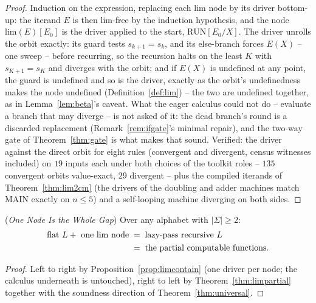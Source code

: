 \begin{proof}
    Induction on the expression, replacing each $\mathrm{lim}$ node by
    its driver bottom-up: the iterand $E$ is then $\mathrm{lim}$-free
    by the induction hypothesis, and the node
    $\mathrm{lim}(E)[E_0]$ is the driver applied to the start,
    $\mathrm{RUN}[E_0/X]$. The driver unrolls the orbit exactly: its
    guard tests $s_{k+1} = s_k$, and its else-branch forces $E(X)$ --
    one sweep -- before recurring, so the recursion halts on the least
    $K$ with $s_{K+1} = s_K$ and diverges with the orbit; and if
    $E(X)$ is undefined at any point, the guard is undefined and so is
    the driver, exactly as the orbit's undefinedness makes the node
    undefined (Definition~\ref{def:lim}) -- the two are undefined
    together, as in Lemma~\ref{lem:beta}'s caveat. What the eager
    calculus could not do -- evaluate a branch that may diverge -- is
    not asked of it: the dead branch's round is a discarded
    replacement (Remark~\ref{rem:ifgate}'s minimal repair), and the
    two-way gate of Theorem~\ref{thm:gate} is what makes that sound.
    Verified: the driver against the direct orbit for eight rules
    (convergent and divergent, census witnesses included) on $19$
    inputs each under both choices of the toolkit roles -- $135$
    convergent orbits value-exact, $29$ divergent -- plus the compiled
    iterands of Theorem~\ref{thm:lim2cm} (the drivers of the doubling
    and adder machines match $\mathrm{MAIN}$ exactly on $n \leq 5$) and
    a self-looping machine diverging on both sides.
\end{proof}

\begin{corollary}
    (\emph{One Node Is the Whole Gap})
    \label{cor:limclass}
    Over any alphabet with $|\Sigma| \geq 2$:
    \begin{align}
        \text{flat } L + \text{ one } \mathrm{lim} \text{ node}
        \;&=\; \text{lazy-pass recursive } L \notag \\
        \;&=\; \text{the partial computable functions.}
    \end{align}
\end{corollary}

\begin{proof}
    Left to right by Proposition~\ref{prop:limcontain} (one driver per
    node; the calculus underneath is untouched), right to left by
    Theorem~\ref{thm:limpartial} together with the soundness direction
    of Theorem~\ref{thm:universal}.
\end{proof}

